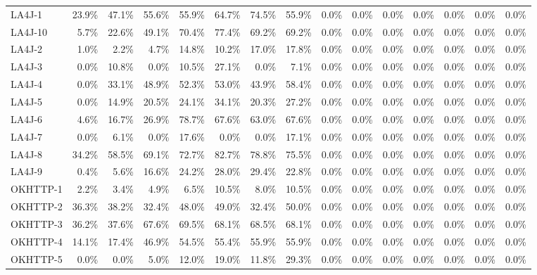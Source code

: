 \begin{tabular}{ l rrrrrrr rrrrrrr}
LA4J-1 &  23.9\% &  47.1\% &  55.6\% &  55.9\% &  64.7\% &  74.5\% &  55.9\% &  0.0\% &  0.0\% &  0.0\% &  0.0\% &  0.0\% &  0.0\% &  0.0\%\\ 
LA4J-10 &  5.7\% &  22.6\% &  49.1\% &  70.4\% &  77.4\% &  69.2\% &  69.2\% &  0.0\% &  0.0\% &  0.0\% &  0.0\% &  0.0\% &  0.0\% &  0.0\%\\ 
LA4J-2 &  1.0\% &  2.2\% &  4.7\% &  14.8\% &  10.2\% &  17.0\% &  17.8\% &  0.0\% &  0.0\% &  0.0\% &  0.0\% &  0.0\% &  0.0\% &  0.0\%\\ 
LA4J-3 &  0.0\% &  10.8\% &  0.0\% &  10.5\% &  27.1\% &  0.0\% &  7.1\% &  0.0\% &  0.0\% &  0.0\% &  0.0\% &  0.0\% &  0.0\% &  0.0\%\\ 
LA4J-4 &  0.0\% &  33.1\% &  48.9\% &  52.3\% &  53.0\% &  43.9\% &  58.4\% &  0.0\% &  0.0\% &  0.0\% &  0.0\% &  0.0\% &  0.0\% &  0.0\%\\ 
LA4J-5 &  0.0\% &  14.9\% &  20.5\% &  24.1\% &  34.1\% &  20.3\% &  27.2\% &  0.0\% &  0.0\% &  0.0\% &  0.0\% &  0.0\% &  0.0\% &  0.0\%\\ 
LA4J-6 &  4.6\% &  16.7\% &  26.9\% &  78.7\% &  67.6\% &  63.0\% &  67.6\% &  0.0\% &  0.0\% &  0.0\% &  0.0\% &  0.0\% &  0.0\% &  0.0\%\\ 
LA4J-7 &  0.0\% &  6.1\% &  0.0\% &  17.6\% &  0.0\% &  0.0\% &  17.1\% &  0.0\% &  0.0\% &  0.0\% &  0.0\% &  0.0\% &  0.0\% &  0.0\%\\ 
LA4J-8 &  34.2\% &  58.5\% &  69.1\% &  72.7\% &  82.7\% &  78.8\% &  75.5\% &  0.0\% &  0.0\% &  0.0\% &  0.0\% &  0.0\% &  0.0\% &  0.0\%\\ 
LA4J-9 &  0.4\% &  5.6\% &  16.6\% &  24.2\% &  28.0\% &  29.4\% &  22.8\% &  0.0\% &  0.0\% &  0.0\% &  0.0\% &  0.0\% &  0.0\% &  0.0\%\\ 
OKHTTP-1 &  2.2\% &  3.4\% &  4.9\% &  6.5\% &  10.5\% &  8.0\% &  10.5\% &  0.0\% &  0.0\% &  0.0\% &  0.0\% &  0.0\% &  0.0\% &  0.0\%\\ 
OKHTTP-2 &  36.3\% &  38.2\% &  32.4\% &  48.0\% &  49.0\% &  32.4\% &  50.0\% &  0.0\% &  0.0\% &  0.0\% &  0.0\% &  0.0\% &  0.0\% &  0.0\%\\ 
OKHTTP-3 &  36.2\% &  37.6\% &  67.6\% &  69.5\% &  68.1\% &  68.5\% &  68.1\% &  0.0\% &  0.0\% &  0.0\% &  0.0\% &  0.0\% &  0.0\% &  0.0\%\\ 
OKHTTP-4 &  14.1\% &  17.4\% &  46.9\% &  54.5\% &  55.4\% &  55.9\% &  55.9\% &  0.0\% &  0.0\% &  0.0\% &  0.0\% &  0.0\% &  0.0\% &  0.0\%\\ 
OKHTTP-5 &  0.0\% &  0.0\% &  5.0\% &  12.0\% &  19.0\% &  11.8\% &  29.3\% &  0.0\% &  0.0\% &  0.0\% &  0.0\% &  0.0\% &  0.0\% &  0.0\%\\ 

\end{tabular}
